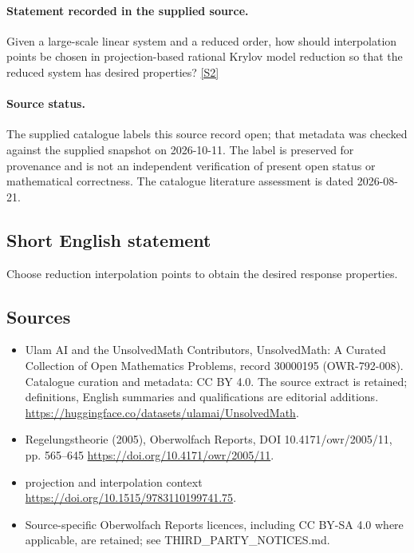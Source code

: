 \documentclass[11pt]{article}
\begin{document}
\paragraph{Statement recorded in the supplied source.}
Given a large-scale linear system and a reduced order, how should interpolation points be chosen in projection-based rational Krylov model reduction so that the reduced system has desired properties? \href{https://doi.org/10.4171/owr/2005/11}{[S2]}
\paragraph{Source status.}
The supplied catalogue labels this source record open; that metadata was checked against the supplied snapshot on 2026-10-11. The label is preserved for provenance and is not an independent verification of present open status or mathematical correctness. The catalogue literature assessment is dated 2026-08-21.
\subsection{Short English statement}
Choose reduction interpolation points to obtain the desired response properties.
\subsection{Sources}
\begin{itemize}
\item[S1] Ulam AI and the UnsolvedMath Contributors, UnsolvedMath: A Curated Collection of Open Mathematics Problems, record 30000195 (OWR-792-008). Catalogue curation and metadata: CC BY 4.0. The source extract is retained; definitions, English summaries and qualifications are editorial additions.
\url{https://huggingface.co/datasets/ulamai/UnsolvedMath}.
\item[S2] Regelungstheorie (2005), Oberwolfach Reports, DOI 10.4171/owr/2005/11, pp. 565--645
\url{https://doi.org/10.4171/owr/2005/11}.
\item[S3] projection and interpolation context
\url{https://doi.org/10.1515/9783110199741.75}.
\item Source-specific Oberwolfach Reports licences, including CC BY-SA 4.0 where applicable, are retained; see THIRD\_PARTY\_NOTICES.md.
\end{itemize}
\end{document}
